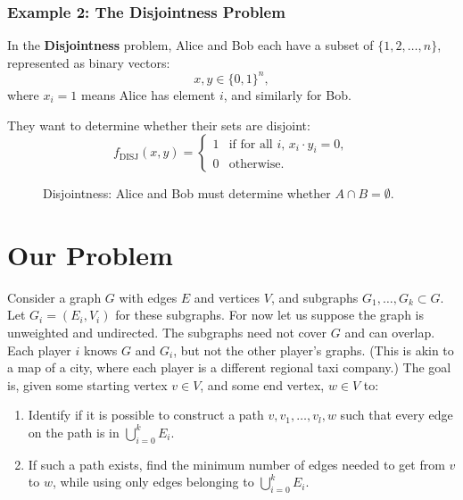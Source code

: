 \documentclass{article}
\begin{document}
\bigskip


\subsubsection*{Example 2: The Disjointness Problem}

In the \textbf{Disjointness} problem, Alice and Bob each have a subset of $\{1,2,\dots,n\}$, represented as binary vectors:
\[
x,y \in \{0,1\}^n,
\]
where $x_i = 1$ means Alice has element $i$, and similarly for Bob.

They want to determine whether their sets are disjoint:
\[
f_{\text{DISJ}}(x,y)=
\begin{cases}
1 & \text{if for all } i,\, x_i \cdot y_i = 0,\\
0 & \text{otherwise}.
\end{cases}
\]


\begin{figure}[h]
\centering
{}
\caption{Disjointness: Alice and Bob must determine whether $A\cap B=\emptyset$.}
\end{figure}


\newpage

\section*{Our Problem}
Consider a graph $G$ with edges $E$ and vertices $V$, and subgraphs $G_1, \ldots, G_k \subset G$. Let $G_i = (E_i, V_i)$ for these subgraphs. For now let us suppose the graph is unweighted and undirected. The subgraphs need not cover $G$ and can overlap. Each player $i$ knows $G$ and $G_i$, but not the other player's graphs. (This is akin to a map of a city, where each player is a different regional taxi company.) The goal is, given some starting vertex $v \in V$, and some end vertex, $w \in V$ to:
\begin{enumerate}
	\item  Identify if it is possible to construct a path $v, v_1, \dots, v_l, w$ such that every edge on the path is in $\bigcup_{i=0}^{k} E_i$. \label{one}
	\item  If such a path exists, find the minimum number of edges needed to get from $v$ to $w$, while using only edges belonging to $\bigcup_{i=0}^{k} E_i$. \label{two}
\end{enumerate}
\end{document}
